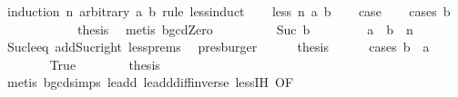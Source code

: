 \begin{isabellebody}
\ {\isacharparenleft}{\kern0pt}induction\ n\ arbitrary{\isacharcolon}{\kern0pt}\ a\ b\ rule{\isacharcolon}{\kern0pt}\ less{\isacharunderscore}{\kern0pt}induct{\isacharparenright}{\kern0pt}\isanewline
\ \ \isamarkupfalse%
\ {\isacharparenleft}{\kern0pt}less\ n\ a\ b{\isacharparenright}{\kern0pt}\isanewline
\ \ \isamarkupfalse%
\ {\isacharquery}{\kern0pt}case\isanewline
\ \ \isamarkupfalse%
\ {\isacharparenleft}{\kern0pt}cases\ b{\isacharparenright}{\kern0pt}\isanewline
\ \ \ \ \isamarkupfalse%
\ {}\isanewline
\ \ \ \ \isamarkupfalse%
\ {\isacharquery}{\kern0pt}thesis\ \isamarkupfalse%
\ {\isacharparenleft}{\kern0pt}metis\ bgcdZero{\isacharparenright}{\kern0pt}\ \isanewline
\ \ \isamarkupfalse%
\isanewline
\ \ \ \ \isamarkupfalse%
\ {\isacharparenleft}{\kern0pt}Suc\ b{\isacharprime}{\kern0pt}{\isacharparenright}{\kern0pt}\isanewline
\ \ \ \ \isamarkupfalse%
\ \isamarkupfalse%
\ {\isacharasterisk}{\kern0pt}{\isacharcolon}{\kern0pt}\ {\isachardoublequoteopen}a\ {\isacharplus}{\kern0pt}\ b{\isacharprime}{\kern0pt}\ {\isacharless}{\kern0pt}\ n{\isachardoublequoteclose}\isanewline
\ \ \ \ \ \ \isamarkupfalse%
\ Suc{\isacharunderscore}{\kern0pt}le{\isacharunderscore}{\kern0pt}eq\ add{\isacharunderscore}{\kern0pt}Suc{\isacharunderscore}{\kern0pt}right\ less{\isachardot}{\kern0pt}prems\ \isamarkupfalse%
\ presburger\isanewline
\ \ \ \ \isamarkupfalse%
\ {\isacharquery}{\kern0pt}thesis\isanewline
\ \ \ \ \isamarkupfalse%
\ {\isacharparenleft}{\kern0pt}cases\ {\isachardoublequoteopen}b\ {\isasymle}\ a{\isachardoublequoteclose}{\isacharparenright}{\kern0pt}\isanewline
\ \ \ \ \ \ \isamarkupfalse%
\ True\isanewline
\ \ \ \ \ \ \isamarkupfalse%
\ {\isacharquery}{\kern0pt}thesis\isanewline
\ \ \ \ \ \ \ \ \isamarkupfalse%
\ {\isacharparenleft}{\kern0pt}metis\ bgcd{\isachardot}{\kern0pt}simps\ le{\isacharunderscore}{\kern0pt}add{}\ le{\isacharunderscore}{\kern0pt}add{\isacharunderscore}{\kern0pt}diff{\isacharunderscore}{\kern0pt}inverse\ less{\isachardot}{\kern0pt}IH\ {\isacharbrackleft}{\kern0pt}OF\ {\isacharasterisk}{\kern0pt}{\isacharbrackright}{\kern0pt}{\isacharparenright}{\kern0pt}\isanewline
\ \ \ \ \isamarkupfalse%
\isanewline
\ \ \ \ \ \ \isamarkupfalse%

\end{isabellebody}
